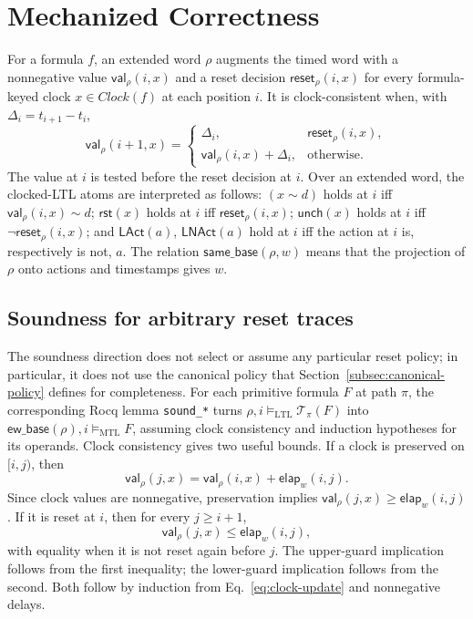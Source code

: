 \documentclass[manuscript]{acmart}
\newcommand{\satM}{\models_{\mathrm{MTL}}}
\newcommand{\satL}{\models_{\mathrm{LTL}}}
\providecommand{\Reset}{}\renewcommand{\Reset}{\mathsf{rst}}
\newcommand{\Unch}{\mathsf{unch}}
\newcommand{\T}{\mathcal{T}}
\newcommand{\CVal}{\mathsf{val}}
\newcommand{\CReset}{\mathsf{reset}}
\newcommand{\elapsed}{\mathsf{elap}}
\newcommand{\ewbase}{\mathsf{ew\_base}}
\newcommand{\Clock}{\mathit{Clock}}
\begin{document}
\section{Mechanized Correctness}
\label{sec:correctness}
\label{sec:encoding-correctness}
For a formula $f$, an extended word $\rho$ augments the timed word with a
nonnegative value $\CVal_\rho(i,x)$ and a reset decision
$\CReset_\rho(i,x)$ for every formula-keyed clock $x\in\Clock(f)$ at each
position $i$. It is clock-consistent when, with
$\Delta_i=t_{i+1}-t_i$,
\begin{equation}
\CVal_\rho(i+1,x)=
\begin{cases}
\Delta_i,&\CReset_\rho(i,x),\\
\CVal_\rho(i,x)+\Delta_i,&\text{otherwise.}
\end{cases}
\label{eq:clock-update}
\end{equation}
The value at $i$ is tested before the reset decision at $i$.
Over an extended word, the clocked-LTL atoms are interpreted as follows:
$(x\sim d)$ holds at $i$ iff $\CVal_\rho(i,x)\sim d$; $\Reset(x)$ holds at $i$
iff $\CReset_\rho(i,x)$; $\Unch(x)$ holds at $i$ iff $\neg\CReset_\rho(i,x)$;
and $\mathsf{LAct}(a)$, $\mathsf{LNAct}(a)$ hold at $i$ iff the action at $i$
is, respectively is not, $a$. The relation
$\mathsf{same\_base}(\rho,w)$ means that the projection of $\rho$ onto actions
and timestamps gives $w$.

\subsection{Soundness for arbitrary reset traces}
\label{subsec:primitive-soundness}
The soundness direction does not select or assume any particular reset
policy; in particular, it does not use the canonical policy that
Section~\ref{subsec:canonical-policy} defines for completeness. For
each primitive formula $F$ at path $\pi$, the corresponding Rocq lemma
\texttt{sound\_*} turns $\rho,i\satL\T_\pi(F)$ into
$\ewbase(\rho),i\satM F$, assuming clock consistency and
induction hypotheses for its operands. 
Clock consistency gives two useful bounds. If a clock is preserved on
$[i,j)$, then
\[
\CVal_\rho(j,x)=\CVal_\rho(i,x)+\elapsed_w(i,j).
\]
Since clock values are nonnegative, preservation implies
$\CVal_\rho(j,x)\ge\elapsed_w(i,j)$. If it is reset at $i$, then for every
$j\ge i+1$,
\[
\CVal_\rho(j,x)\le\elapsed_w(i,j),
\]
with equality when it is not reset again before $j$. The upper-guard
implication follows from the first inequality; the lower-guard implication
follows from the second. Both follow by induction from
Eq.~\eqref{eq:clock-update} and nonnegative delays.
\end{document}
